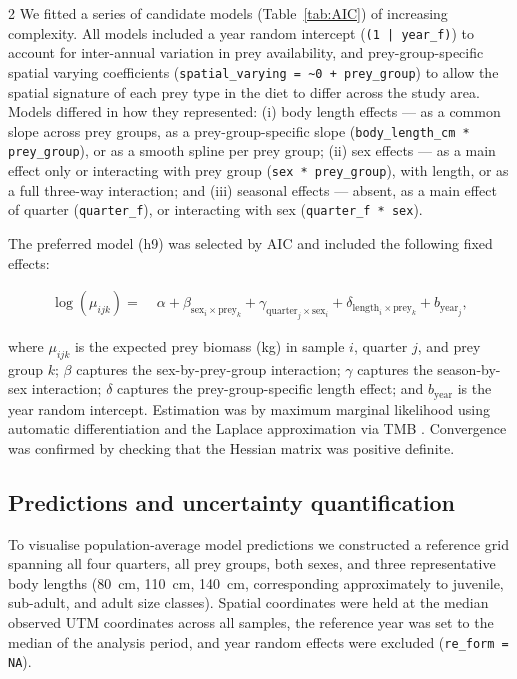 \begin{spacing}{2}
We fitted a series of candidate models (Table~\ref{tab:AIC}) of increasing
complexity. All models included a year random intercept
(\texttt{(1 | year\_f)}) to account for inter-annual variation in prey
availability, and prey-group-specific spatial varying coefficients
(\texttt{spatial\_varying = \textasciitilde 0 + prey\_group}) to allow the
spatial signature of each prey type in the diet to differ across the study
area. Models differed in how they represented: (i) body length effects ---
as a common slope across prey groups, as a prey-group-specific slope
(\texttt{body\_length\_cm * prey\_group}), or as a smooth spline per prey
group; (ii) sex effects --- as a main effect only or interacting with prey
group (\texttt{sex * prey\_group}), with length, or as a full three-way
interaction; and (iii) seasonal effects --- absent, as a main effect of
quarter (\texttt{quarter\_f}), or interacting with sex
(\texttt{quarter\_f * sex}).

The preferred model (h9) was selected by AIC and included the following
fixed effects:

\begin{align}
\log(\mu_{ijk}) = \; &\alpha + \beta_{\text{sex}_{i} \times \text{prey}_{k}}
+ \gamma_{\text{quarter}_{j} \times \text{sex}_{i}}
+ \delta_{\text{length}_{i} \times \text{prey}_{k}}
+ b_{\text{year}_{j}},
\label{eq:model}
\end{align}

\noindent where $\mu_{ijk}$ is the expected prey biomass (kg) in sample $i$,
quarter $j$, and prey group $k$; $\beta$ captures the sex-by-prey-group
interaction; $\gamma$ captures the season-by-sex interaction; $\delta$
captures the prey-group-specific length effect; and $b_{\text{year}}$ is
the year random intercept. Estimation was by maximum marginal likelihood
using automatic differentiation and the Laplace approximation via TMB
\citep{Anderson2024}. Convergence was confirmed by checking that the Hessian
matrix was positive definite.

\subsection{Predictions and uncertainty quantification}

To visualise population-average model predictions we constructed a
reference grid spanning all four quarters, all prey groups, both sexes, and
three representative body lengths (80~cm, 110~cm, 140~cm, corresponding
approximately to juvenile, sub-adult, and adult size classes). Spatial
coordinates were held at the median observed UTM coordinates across all
samples, the reference year was set to the median of the analysis period,
and year random effects were excluded (\texttt{re\_form = NA}).


\end{spacing}
